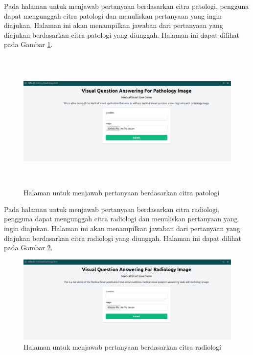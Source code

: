 \par Pada halaman untuk menjawab pertanyaan berdasarkan citra patologi, pengguna dapat mengunggah citra patologi dan menuliskan pertanyaan yang ingin diajukan. Halaman ini akan menampilkan jawaban dari pertanyaan yang diajukan berdasarkan citra patologi yang diunggah. Halaman ini dapat dilihat pada Gambar \ref{fig:halaman-patologi}.

\begin{figure}[H]
  \centering
  \label{fig:halaman-patologi}
  \includegraphics[width=\textwidth, height = 7cm]{image/bab4/halaman_patologi.png}
  \caption{Halaman untuk menjawab pertanyaan berdasarkan citra patologi}
  \label{fig:halaman-patologi}
\end{figure}

Pada halaman untuk menjawab pertanyaan berdasarkan citra radiologi, pengguna dapat mengunggah citra radiologi dan menuliskan pertanyaan yang ingin diajukan. Halaman ini akan menampilkan jawaban dari pertanyaan yang diajukan berdasarkan citra radiologi yang diunggah. Halaman ini dapat dilihat pada Gambar \ref{fig:halaman-radiologi}.

\begin{figure}[H]
  \centering
  \label{fig:halaman-radiologi}
  \includegraphics[width=\textwidth]{image/bab4/halaman_radiologi.png}
  \caption{Halaman untuk menjawab pertanyaan berdasarkan citra radiologi}
  \label{fig:halaman-radiologi}
\end{figure}

